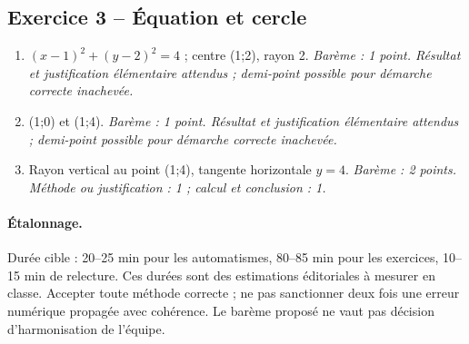 \subsection*{Exercice 3 -- Équation et cercle}
\begin{enumerate}
\item $(x-1)^2+(y-2)^2=4$ ; centre (1;2), rayon 2. \textit{Barème : 1 point. Résultat et justification élémentaire attendus ; demi-point possible pour démarche correcte inachevée.}
\item (1;0) et (1;4). \textit{Barème : 1 point. Résultat et justification élémentaire attendus ; demi-point possible pour démarche correcte inachevée.}
\item Rayon vertical au point (1;4), tangente horizontale $y=4$. \textit{Barème : 2 points. Méthode ou justification : 1 ; calcul et conclusion : 1.}
\end{enumerate}
\paragraph{Étalonnage.} Durée cible : 20–25 min pour les automatismes, 80–85 min pour les exercices, 10–15 min de relecture. Ces durées sont des estimations éditoriales à mesurer en classe. Accepter toute méthode correcte ; ne pas sanctionner deux fois une erreur numérique propagée avec cohérence. Le barème proposé ne vaut pas décision d’harmonisation de l’équipe.
